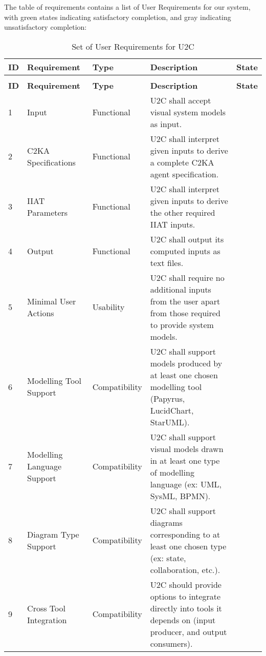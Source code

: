The table of requirements contains a list of User Requirements for our system,
with green states indicating satisfactory completion, and gray indicating unsatisfactory completion:
\begin{longtable}{|l|p{2.6cm}|l|p{4.5cm}|c|}
    \caption{Set of User Requirements for U2C}\label{tab:user-reqs}\\ \hline
    \textbf{ID} & \textbf{Requirement} & \textbf{Type}  & \textbf{Description} & \textbf{State} \\ \hline
    \endfirsthead
    \caption{Set of User Requirements for U2C} \\ \hline
    \textbf{ID} & \textbf{Requirement} & \textbf{Type}  & \textbf{Description} & \textbf{State} \\
    \hline
    \endhead
    \hline
    1 & Input & Functional & U2C shall accept visual system models as input. & \cellcolor{green!30}  \\
    \hline
    2 & C2KA Specifications & Functional & U2C shall interpret given inputs to derive a complete C2KA agent specification. & \cellcolor{green!30}  \\
    \hline
    3 & IIAT Parameters & Functional & U2C shall interpret given inputs to derive the other required IIAT inputs. & \cellcolor{gray!30}  \\
    \hline
    4 & Output & Functional & U2C shall output its computed inputs as text files. & \cellcolor{green!30}  \\
    \hline
    5 & Minimal User Actions & Usability & U2C shall require no additional inputs from the user apart from those required to provide system models. & \cellcolor{green!30}  \\
    \hline
    6 & Modelling Tool Support & Compatibility & U2C shall support models produced by at least one chosen modelling tool (Papyrus, LucidChart, StarUML). & \cellcolor{green!30}  \\
    \hline
    7 & Modelling Language Support & Compatibility & U2C shall support visual models drawn in at least one type of modelling language (ex: UML, SysML, BPMN). & \cellcolor{green!30}  \\
    \hline
    8 & Diagram Type Support & Compatibility & U2C shall support diagrams corresponding to at least one chosen type (ex: state, collaboration, etc.). & \cellcolor{green!30}  \\
    \hline
    9 & Cross Tool Integration & Compatibility & U2C should provide options to integrate directly into tools it depends on (input producer, and output consumers). & \cellcolor{gray!30}  \\

\end{longtable}

